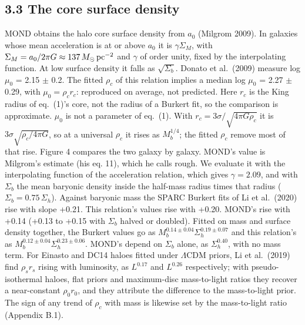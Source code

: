\documentclass[
  10pt,
]{article}
\begin{document}
\subsection{3.3 The core surface density}\label{the-core-surface-density}

MOND obtains the halo core surface density from $a_0$ (Milgrom 2009). In galaxies whose mean acceleration is at or above $a_0$ it is $\gamma\Sigma_M$, with $\Sigma_M=a_0/2\pi G\approx137\,M_\odot\,{\rm pc}^{-2}$ and $\gamma$ of order unity, fixed by the interpolating function. At low surface density it falls as $\sqrt{\Sigma_b}$. Donato et al.~(2009) measure log $\mu_0$ = 2.15 $\pm$ 0.2. The fitted $\rho_c$ of this relation implies a median log $\mu_0$ = 2.27 $\pm$ 0.29, with $\mu_0=\rho_c r_c$: reproduced on average, not predicted. Here $r_c$ is the King radius of eq.~(1)'s core, not the radius of a Burkert fit, so the comparison is approximate. $\mu_0$ is not a parameter of eq.~(1). With $r_c=3\sigma/\sqrt{4\pi G\rho_c}$ it is $3\sigma\sqrt{\rho_c/4\pi G}$, so at a universal $\rho_c$ it rises as $M_b^{1/4}$; the fitted $\rho_c$ remove most of that rise. Figure 4 compares the two galaxy by galaxy. MOND's value is Milgrom's estimate (his eq. 11), which he calls rough. We evaluate it with the interpolating function of the acceleration relation, which gives $\gamma=2.09$, and with $\Sigma_b$ the mean baryonic density inside the half-mass radius times that radius ($\Sigma_b=0.75\,\Sigma_h$). Against baryonic mass the SPARC Burkert fits of Li et al.~(2020) rise with slope +0.21. This relation's values rise with +0.20. MOND's rise with +0.14 (+0.13 to +0.15 with $\Sigma_b$ halved or doubled). Fitted on mass and surface density together, the Burkert values go as $M_b^{0.14\pm0.04}\Sigma_h^{0.19\pm0.07}$ and this relation's as $M_b^{0.12\pm0.04}\Sigma_h^{0.23\pm0.06}$. MOND's depend on $\Sigma_b$ alone, as $\Sigma_h^{0.40}$, with no mass term. For Einasto and DC14 haloes fitted under $\Lambda$CDM priors, Li et al.~(2019) find $\rho_s r_s$ rising with luminosity, as $L^{0.17}$ and $L^{0.26}$ respectively; with pseudo-isothermal haloes, flat priors and maximum-disc mass-to-light ratios they recover a near-constant $\rho_0 r_0$, and they attribute the difference to the mass-to-light prior. The sign of any trend of $\rho_c$ with mass is likewise set by the mass-to-light ratio (Appendix B.1).
\end{document}
